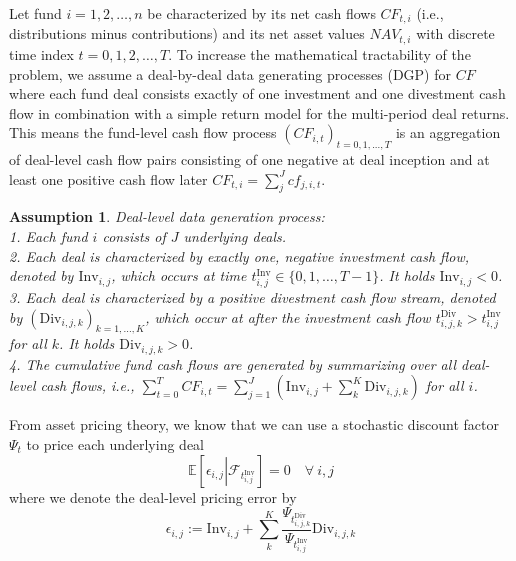 \documentclass[12pt]{article}
\newtheorem{assume}{Assumption}
\begin{document}
Let fund $i=1,2,\dots,n$ be characterized by its net cash flows ${CF}_{t,i}$ (i.e., distributions minus contributions) and its net asset values ${NAV}_{t,i}$ with discrete time index $t=0,1,2,\dots,T$.
To increase the mathematical tractability of the problem, we assume a  deal-by-deal data generating processes (DGP) for $CF$ where each fund deal consists exactly of one investment and one divestment cash flow in combination with a simple return model for the multi-period deal returns.
This means the fund-level cash flow process $(CF_{i,t})_{t=0,1,...,T}$ is an aggregation of deal-level cash flow pairs consisting of one negative at deal inception and at least one positive cash flow later $CF_{t,i} = \sum_j^J {cf}_{j,i,t}$.
\begin{assume}
	\label{ass:deal_level_dgp}
	Deal-level data generation process: \\
	1. Each fund $i$ consists of $J$ underlying deals. \\
	2. Each deal is characterized by exactly one, negative investment cash flow, denoted by $\mathrm{Inv}_{i,j}$, which occurs at time $t_{i,j}^{\mathrm{Inv}} \in \{ 0,1,\dots, T-1 \}$. 
	It holds $\mathrm{Inv}_{i,j} < 0$. \\
	3. Each deal is characterized by a positive divestment cash flow stream, denoted by $(\mathrm{Div}_{i,j,k})_{k=1,\dots,K}$, which occur at after the investment cash flow $t_{i,j,k}^{\mathrm{Div}} > t_{i,j}^{\mathrm{Inv}}$ for all $k$.
	It holds $\mathrm{Div}_{i,j,k} > 0$. \\
	4. The cumulative fund cash flows are generated by summarizing over all deal-level cash flows, i.e., 
	$\sum_{t=0}^T {CF}_{i,t} = \sum_{j=1}^J \left( \mathrm{Inv}_{i,j} + \sum_k^K \mathrm{Div}_{i,j,k} \right)$ for all $i$.
\end{assume}

From asset pricing theory, we know that we can use a stochastic discount factor $\Psi_t$ to price each underlying deal
\begin{equation}
	\label{eq:deal_pricing}
	\mathbb{E} \left[ 
	\epsilon_{i,j}
	\left| \mathcal{F}_{t_{i,j}^{\mathrm{Inv}}} \right.
	\right] = 0
	\quad \forall \ i,j
\end{equation}
where we denote the deal-level pricing error by
\begin{equation}
	\epsilon_{i,j} :=
	\label{eq:deal_pricing_error}
	\mathrm{Inv}_{i,j} +
	\sum_k^K
	\frac{\Psi_{t_{i,j,k}^{\mathrm{Div}}}}{\Psi_{t_{i,j}^{\mathrm{Inv}}}}
	\mathrm{Div}_{i,j,k}
\end{equation}
\end{document}
